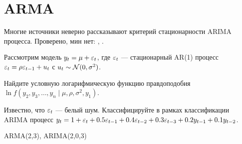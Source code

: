 
\chapter{ARMA}

Многие источники неверно рассказывают критерий стационарности ARIMA процесса. 
Проверено, мин нет: \cite{van2010time}, \cite{tsay2005analysis}.


\begin{problem}
Рассмотрим модель $y_t=\mu + \varepsilon_t$, где $\varepsilon_t$ — стационарный AR(1) процесс $\varepsilon_t=\rho \varepsilon_{t-1} + u_t$ с $u_t \sim \mathcal{N}(0,\sigma^2)$. 

Найдите условную логарифмическую функцию правдоподобия $\ln f(y_2, y_3, \ldots, y_n \mid \mu, \rho, \sigma^2, y_1)$.
\begin{sol}

\end{sol}
\end{problem}

\begin{problem}
Известно, что $\varepsilon_t$ — белый шум. 
Классифицируйте в рамках классификации ARIMA процесс $y_t=1+\varepsilon_t + 0.5\varepsilon_{t-1} + 0.4\varepsilon_{t-2} + 0.3\varepsilon_{t-3} + 0.2y_{t-1} + 0.1y_{t-2}$.
\begin{sol}

ARMA(2,3), ARIMA(2,0,3)
\end{sol}
\end{problem}


